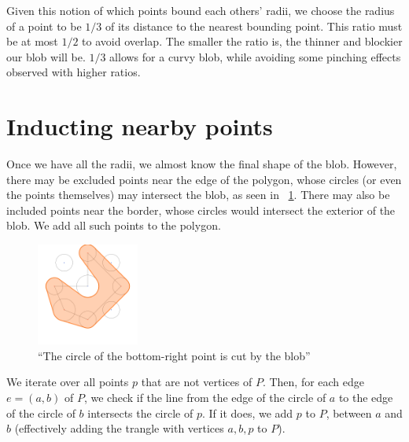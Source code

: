 \documentclass[paper=a4, fontsize=11pt]{scrartcl} %
\numberwithin{equation}{section} %
\numberwithin{figure}{section} %
\numberwithin{table}{section} %
\begin{document}
Given this notion of which points bound each others' radii, we choose the radius
of a point to be $1/3$ of its distance to the nearest bounding point. This
ratio must be at most $1/2$ to avoid overlap. The smaller the ratio is, the
thinner and blockier our blob will be. $1/3$ allows for a curvy blob, while
avoiding some pinching effects observed with higher ratios.

\section{Inducting nearby points}
Once we have all the radii, we almost know the final shape of the blob. However,
there may be excluded points near the edge of the polygon, whose circles (or
even the points themselves) may intersect the blob, as seen in
~\ref{fig:whyrefine}. There may also be included points near the border, whose
circles would intersect the exterior of the blob.  We add all such points to the
polygon.

\begin{figure}[h]
\includegraphics[width=0.3\textwidth]{whyrefine}
\centering
\caption{``The circle of the bottom-right point is cut by the blob''}
\label{fig:whyrefine}
\end{figure}

We iterate over all points $p$ that are not vertices of $P$. Then, for each edge
$e = (a,b)$ of $P$, we check if the line from the edge of the circle of $a$ to
the edge of the circle of $b$ intersects the circle of $p$. If it does, we add
$p$ to $P$, between $a$ and $b$ (effectively adding the trangle with vertices
$a,b,p$ to $P$). \\
\end{document}
